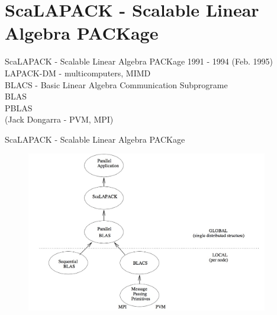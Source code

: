 \section{ScaLAPACK - Scalable Linear Algebra PACKage}
	\begin{frame}{ScaLAPACK - Scalable Linear Algebra PACKage}
		1991 - 1994 (Feb. 1995) \\
		LAPACK-DM - multicomputers, MIMD \\
		\vspace{5mm}
		BLACS - Basic Linear Algebra Communication Subprograme \\
		BLAS \\
		PBLAS \\
		\vspace{5mm}
		(Jack Dongarra - PVM, MPI)
		\vspace{5mm}

	\end{frame}
	\begin{frame}{ScaLAPACK - Scalable Linear Algebra PACKage}
		\begin{figure}
			\includegraphics[height=7cm]{img/13/scalapack}
		\end{figure}
	\end{frame}
